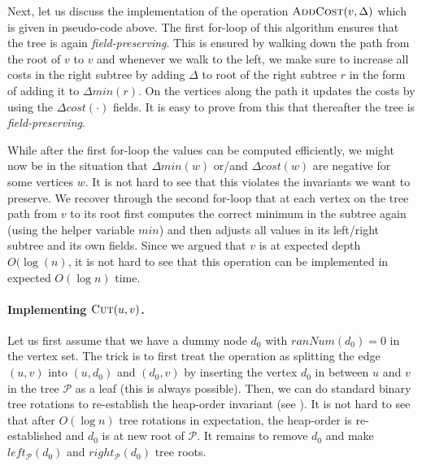Next, let us discuss the implementation of the operation $\textsc{AddCost}(v, \Delta)$ which is given in pseudo-code above. The first for-loop of this algorithm ensures that the tree is again \emph{field-preserving}. This is ensured by walking down the path from the root of $v$ to $v$ and whenever we walk to the left, we make sure to increase all costs in the right subtree by adding $\Delta$ to root of the right subtree $r$ in the form of adding it to $\Delta min(r)$. On the vertices along the path it updates the costs by using the $\Delta cost(\cdot)$ fields. It is easy to prove from this that thereafter the tree is  \emph{field-preserving}.

While after the first for-loop the values can be computed efficiently, we might now be in the situation that $\Delta min(w)$ or/and $\Delta cost(w)$ are negative for some vertices $w$. It is not hard to see that this violates the invariants we want to preserve. We recover through the second for-loop that at each vertex on the tree path from $v$ to its root first computes the correct minimum in the subtree again (using the helper variable $min$) and then adjusts all values in its left/right subtree and its own fields. Since we argued that $v$ is at expected depth $O(\log(n)$, it is not hard to see that this operation can be implemented in expected $O(\log n)$ time.


\paragraph{Implementing $\textsc{Cut}(u,v)$.} Let us first assume that we have a dummy node $d_0$ with $ranNum(d_0) = 0$ in the vertex set. The trick is to first treat the operation as splitting the edge $(u,v)$ into $(u,d_0)$ and $(d_0,v)$ by inserting the vertex $d_0$ in between $u$ and $v$ in the tree $\mathcal{P}$ as a leaf (this is always possible). Then, we can do standard binary tree rotations to re-establish the heap-order invariant (see ). It is not hard to see that after $O(\log n)$ tree rotations in expectation, the heap-order is re-established and $d_0$ is at new root of $\mathcal{P}$. It remains to remove $d_0$ and make $left_{\mathcal{P}}(d_0)$ and $right_{\mathcal{P}}(d_0)$ tree roots.


